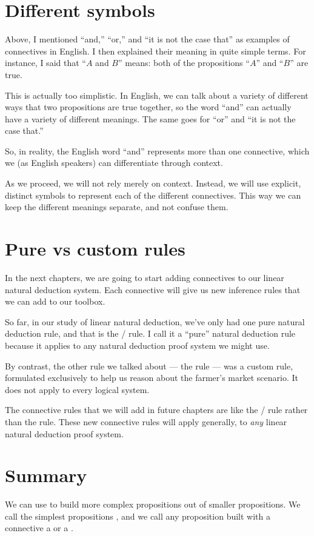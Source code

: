\documentclass[../../../main.tex]{subfiles}
\begin{document}
\section{Different symbols}

Above, I mentioned ``and,'' ``or,'' and ``it is not the case that'' as examples of connectives in English. I then explained their meaning in quite simple terms. For instance, I said that ``$A$ and $B$'' means: both of the propositions ``$A$'' and ``$B$'' are true.

This is actually too simplistic. In English, we can talk about a variety of different ways that two propositions are true together, so the word ``and'' can actually have a variety of different meanings. The same goes for ``or'' and ``it is not the case that.''

So, in reality, the English word ``and'' represents more than one connective, which we (as English speakers) can differentiate through context. 

As we proceed, we will not rely merely on context. Instead, we will use explicit, distinct symbols to represent each of the different connectives. This way we can keep the different meanings separate, and not confuse them.


\section{Pure vs custom rules}

In the next chapters, we are going to start adding connectives to our linear natural deduction system. Each connective will give us new inference rules that we can add to our toolbox.

So far, in our study of linear natural deduction, we've only had one pure natural deduction rule, and that is the \startrule/ rule. I call it a ``pure'' natural deduction rule because it applies to any natural deduction proof system we might use. 

By contrast, the other rule we talked about --- the  rule --- was a custom rule, formulated exclusively to help us reason about the farmer's market scenario. It does not apply to every logical system.

The connective rules that we will add in future chapters are like the \startrule/ rule rather than the  rule. These new connective rules will apply generally, to \emph{any} linear natural deduction proof system.


\section{Summary}

We can use  to build more complex propositions out of smaller propositions. We call the simplest propositions , and we call any proposition built with a connective a  or a . 
\end{document}

